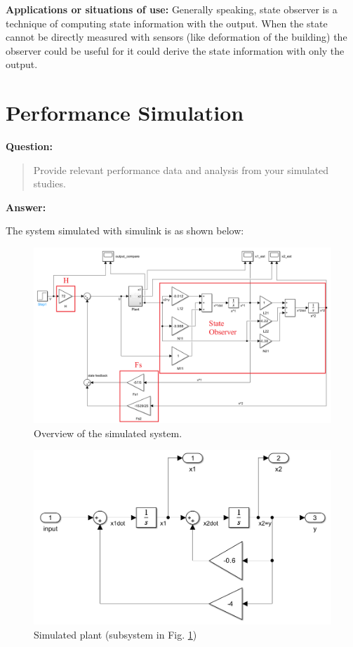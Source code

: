 \documentclass[12pt, oneside]{article}
\begin{document}
\textbf{Applications or situations of use:}
Generally speaking, state observer is a technique of computing state information with the output.
When the state cannot be directly measured with sensors (like deformation of the building) the observer could be useful for it could derive the state information with only the output. 

\section{Performance Simulation}
\label{Performance Simulation}
\textbf{Question:}
\begin{quote}
    Provide relevant performance data and analysis from your simulated studies.
\end{quote}
\textbf{Answer:}

The system simulated with simulink is as shown below:
\begin{figure}[htbp]
    \centering
    \includegraphics[width = \linewidth]{Report/pics/WholeSystem.png}
    \caption{Overview of the simulated system.}
    \label{fig:WholeSystem}
\end{figure}

\begin{figure}[htbp]
    \centering
    \includegraphics[width=0.7\linewidth]{Report/pics/Plant.png}
    \caption{Simulated plant (subsystem in Fig. \ref{fig:WholeSystem})}
    \label{fig:Plant}
\end{figure}
\end{document}
